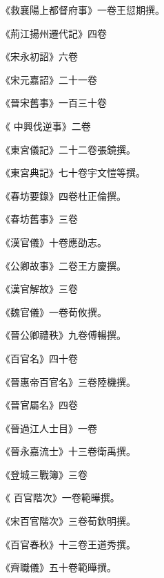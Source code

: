 \begin{pinyinscope}
 《救襄陽上都督府事》一卷王愆期撰。



 《荊江揚州遷代記》四卷



 《宋永初詔》六卷



 《宋元嘉詔》二十一卷



 《晉宋舊事》一百三十卷



 《
 中興伐逆事》二卷



 《東宮儀記》二十二卷張鏡撰。



 《東宮典記》七十卷宇文愷等撰。



 《春坊要錄》四卷杜正倫撰。



 《春坊舊事》三卷



 《漢官儀》十卷應劭志。



 《公卿故事》二卷王方慶撰。



 《漢官解故》三卷



 《魏官儀》一卷荀攸撰。



 《晉公卿禮秩》九卷傅暢撰。



 《百官名》四十卷



 《晉惠帝百官名》三卷陸機撰。



 《晉官屬名》四卷



 《晉過江人士目》一卷



 《晉永嘉流士》十三卷衛禹撰。



 《登城三戰簿》三卷



 《
 百官階次》一卷範曄撰。



 《宋百官階次》三卷荀欽明撰。



 《百官春秋》十三卷王道秀撰。



 《齊職儀》五十卷範曄撰。




\end{pinyinscope}
